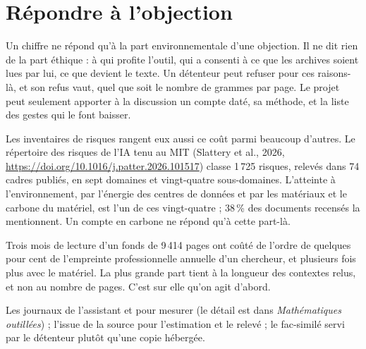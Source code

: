 \section{Répondre à l'objection}

Un chiffre ne répond qu'à la part environnementale d'une objection. Il ne dit rien de la
part éthique : à qui profite l'outil, qui a consenti à ce que les archives soient lues par
lui, ce que devient le texte. Un détenteur peut refuser pour ces raisons-là, et son refus
vaut, quel que soit le nombre de grammes par page. Le projet peut seulement apporter à la
discussion un compte daté, sa méthode, et la liste des gestes qui le font baisser.

Les inventaires de risques rangent eux aussi ce coût parmi beaucoup d'autres. Le répertoire des risques de l'IA
tenu au MIT (Slattery et al., 2026, \url{https://doi.org/10.1016/j.patter.2026.101517})
classe 1\,725 risques, relevés dans 74 cadres publiés, en sept domaines et vingt-quatre
sous-domaines. L'atteinte à l'environnement, par l'énergie des centres de données et par
les matériaux et le carbone du matériel, est l'un de ces vingt-quatre ; 38\,\% des
documents recensés la mentionnent. Un compte en carbone ne répond qu'à cette part-là.

\begin{exemple}
Trois mois de lecture d'un fonds de 9\,414 pages ont coûté de l'ordre de quelques pour cent
de l'empreinte professionnelle annuelle d'un chercheur, et plusieurs fois plus avec le
matériel. La plus grande part tient à la longueur des contextes relus, et non au nombre de
pages. C'est sur elle qu'on agit d'abord.
\end{exemple}

\begin{outils}
Les journaux de l'assistant et  pour mesurer (le détail est dans
\emph{Mathématiques outillées}) ; l'issue de la source pour l'estimation et le relevé ;
le fac-similé servi par le détenteur plutôt qu'une copie hébergée.
\end{outils}
